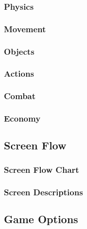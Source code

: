 \documentclass[12pt,titlepage]{article}
\begin{document}
\subsubsection{Physics}

\subsubsection{Movement}

\subsubsection{Objects}

\subsubsection{Actions}

\subsubsection{Combat}

\subsubsection{Economy}

\subsection{Screen Flow}

\subsubsection{Screen Flow Chart}

\subsubsection{Screen Descriptions}
%

\subsection{Game Options}
\end{document}
